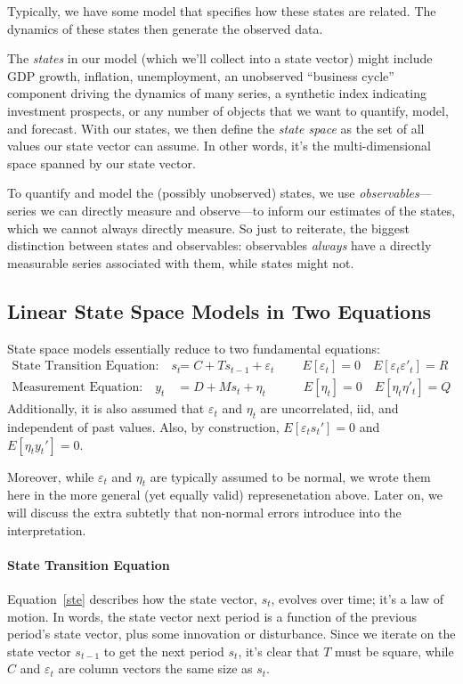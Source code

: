 \documentclass[a4paper,12pt]{article}
\begin{document}
Typically, we have some model that specifies how these states are
related. The dynamics of these states then generate the observed data.

The \emph{states} in our model (which we'll collect into a state vector)
might include GDP growth, inflation, unemployment, an unobserved
``business cycle'' component driving the dynamics of many series, a
synthetic index indicating investment prospects, or any number of
objects that we want to quantify, model, and forecast. With our states,
we then define the \emph{state space} as the set of all values our state
vector can assume. In other words, it's the multi-dimensional space
spanned by our state vector. 

To quantify and model the (possibly unobserved) states, we use
\emph{observables}---series we can directly measure and observe---to
inform our estimates of the states, which we cannot always directly
measure. So just to reiterate, the biggest distinction between states
and observables: observables \emph{always} have a directly measurable
series associated with them, while states might not.


\subsection{Linear State Space Models in Two Equations}

State space models essentially reduce to two fundamental equations:
\begin{align}
  \text{State Transition Equation:} \quad
    s_{t} &= C + T s_{t-1} + \varepsilon_{t} \label{ste}\
    \quad\quad E[\varepsilon_t] = 0
    \quad E[\varepsilon_t \varepsilon'_t] =  R \\
  \text{Measurement Equation:} \quad
    y_{t} &= D + M s_{t} + \eta_{t} \label{moe}
    \quad\qquad E[\eta_t] =  0 
    \quad E[\eta_t \eta'_t] =  Q 
\end{align}
Additionally, it is also assumed that $\varepsilon_t$ and $\eta_t$ are
uncorrelated, iid, and independent of past values. Also, by
construction, $E[\varepsilon_t s_t']=0$ and $E[\eta_t y_t']=0$.

Moreover, while $\varepsilon_t$ and $\eta_t$ are typically assumed to be
normal, we wrote them here in the more general (yet equally valid)
represenetation above. Later on, we will discuss the extra subtetly that
non-normal errors introduce into the interpretation.


\paragraph{State Transition Equation} Equation~\ref{ste} describes how
the state vector, $s_t$, evolves over time; it's a law of motion. In
words, the state vector next period is a function of the previous
period's state vector, plus some innovation or disturbance.  Since we
iterate on the state vector $s_{t-1}$ to get the next period $s_{t}$,
it's clear that $T$ must be square, while $C$ and $\varepsilon_t$ are
column vectors the same size as $s_t$.
\end{document}
